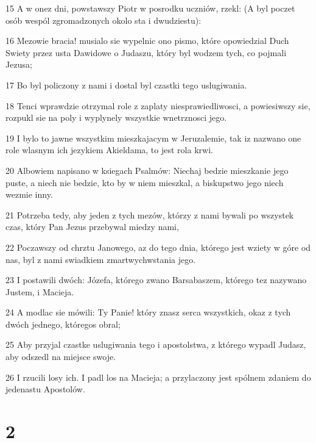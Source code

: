 \par 15 A w onez dni, powstawszy Piotr w posrodku uczniów, rzekl: (A byl poczet osób wespól zgromadzonych okolo sta i dwudziestu):
\par 16 Mezowie bracia! musialo sie wypelnic ono pismo, które opowiedzial Duch Swiety przez usta Dawidowe o Judaszu, który byl wodzem tych, co pojmali Jezusa;
\par 17 Bo byl policzony z nami i dostal byl czastki tego uslugiwania.
\par 18 Tenci wprawdzie otrzymal role z zaplaty niesprawiedliwosci, a powiesiwszy sie, rozpukl sie na poly i wyplynely wszystkie wnetrznosci jego.
\par 19 I bylo to jawne wszystkim mieszkajacym w Jeruzalemie, tak iz nazwano one role wlasnym ich jezykiem Akieldama, to jest rola krwi.
\par 20 Albowiem napisano w ksiegach Psalmów: Niechaj bedzie mieszkanie jego puste, a niech nie bedzie, kto by w niem mieszkal, a biskupstwo jego niech wezmie inny.
\par 21 Potrzeba tedy, aby jeden z tych mezów, którzy z nami bywali po wszystek czas, który Pan Jezus przebywal miedzy nami,
\par 22 Poczawszy od chrztu Janowego, az do tego dnia, którego jest wziety w góre od nas, byl z nami swiadkiem zmartwychwstania jego.
\par 23 I postawili dwóch: Józefa, którego zwano Barsabaszem, którego tez nazywano Justem, i Macieja.
\par 24 A modlac sie mówili: Ty Panie! który znasz serca wszystkich, okaz z tych dwóch jednego, któregos obral;
\par 25 Aby przyjal czastke uslugiwania tego i apostolstwa, z którego wypadl Judasz, aby odszedl na miejsce swoje.
\par 26 I rzucili losy ich. I padl los na Macieja; a przylaczony jest spólnem zdaniem do jedenastu Apostolów.

\chapter{2}

